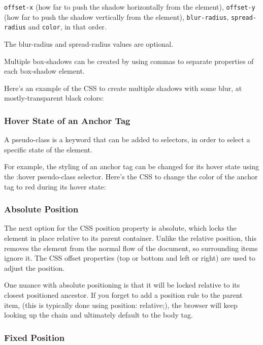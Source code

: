     \texttt{offset-x} (how far to push the shadow horizontally from the element),
    \texttt{offset-y} (how far to push the shadow vertically from the element),
    \texttt{blur-radius},
    \texttt{spread-radius} and
    \texttt{color}, in that order.

The blur-radius and spread-radius values are optional.

Multiple box-shadows can be created by using commas to separate properties of each box-shadow element.

Here's an example of the CSS to create multiple shadows with some blur, at mostly-transparent black colors:


\subsubsection{Hover State of an Anchor Tag}
A pseudo-class is a keyword that can be added to selectors, in order to select a specific state of the element.

For example, the styling of an anchor tag can be changed for its hover state using the :hover pseudo-class selector. Here's the CSS to change the color of the anchor tag to red during its hover state:


\subsubsection{Absolute Position}


The next option for the CSS position property is absolute, which locks the element in place relative to its parent container. Unlike the relative position, this removes the element from the normal flow of the document, so surrounding items ignore it. The CSS offset properties (top or bottom and left or right) are used to adjust the position.

One nuance with absolute positioning is that it will be locked relative to its closest positioned ancestor. If you forget to add a position rule to the parent item, (this is typically done using position: relative;), the browser will keep looking up the chain and ultimately default to the body tag.

\subsubsection{Fixed Position}



